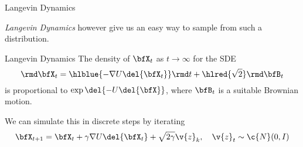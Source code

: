 \begin{frame}{Langevin Dynamics}

\textit{Langevin Dynamics} however give us an easy way to sample from such a distribution.
\begin{theorem}{}{Langevin Dynamics}
The density of $\bfX_t$ as $t \to \infty$ for the SDE
\begin{equation}
    \rmd \bfX_t = \hlblue{-\nabla U \del{\bfX_t}} \rmd t + \hlred{\sqrt{2}} \rmd \bfB_t
\end{equation}
is proportional to $\exp \del{-U\del{\bfX}}$, where $\bfB_t$ is a suitable Brownian motion.
\end{theorem}

\pause
We can simulate this in discrete steps by iterating
\begin{equation}
    \bfX_{t+1} = \bfX_t + \gamma\nabla U\del{\bfX_t} + \sqrt{2\gamma}  \v{z}_k, \quad \v{z}_t \sim \c{N}(0, I)
\end{equation}




\end{frame}

